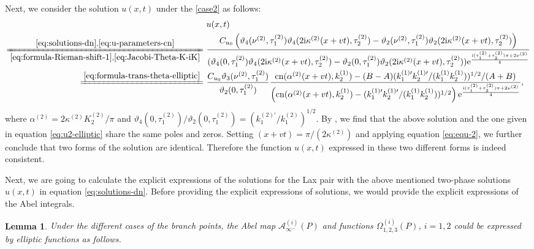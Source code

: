 \documentclass[11pt,reqno]{amsart}
\newcommand{\ii}{\mathrm{i}}
\newcommand{\cn}{\mathrm{cn}}
\newcommand{\ee}{\mathrm{e}}
\newtheorem{lemma}{Lemma}
\numberwithin{equation}{section}
\begin{document}
\begin{proof-prop-equivalent}
	Next, we consider the solution $u(x,t)$ under the \ref{case2} as follows:
	\begin{equation}\nonumber
		\begin{split}
			 &\ u(x,t)\\
			\xlongequal[\eqref{eq:formula-Rieman-shift-1}, \eqref{eq:Jacobi-Theta-K-iK}]{\eqref{eq:solutions-dn}, \eqref{eq:u-parameters-cn}}&\ \frac{C_{u_0}\left(\vartheta_4( \nu^{(2)} , \tau^{(2)} _1)\vartheta_4(2\ii  \kappa^{(2)} (x+vt), \tau^{(2)} _2)-\vartheta_2( \nu^{(2)} , \tau^{(2)} _1)\vartheta_2 (2\ii  \kappa^{(2)} (x+vt), \tau^{(2)} _2)\right)}{(\vartheta_4(0, \tau^{(2)} _1)\vartheta_4(2\ii  \kappa^{(2)} (x+vt), \tau^{(2)} _2)-\vartheta_2(0, \tau^{(2)} _1)\vartheta_2(2\ii  \kappa^{(2)} (x+vt), \tau^{(2)} _2))\ee^{\frac{\ii ( \tau^{(2)} _1+ \tau^{(2)} _2)\pi+2\nu^{(2)}}{4}}}\\
			\xlongequal{\eqref{eq:formula-trans-theta-elliptic}}&\ \frac{C_{u_0}\vartheta_3( \nu^{(2)} , \tau^{(2)} _1)}{\vartheta_2(0, \tau^{(2)} _1)}\frac{\cn( \alpha^{(2)} (x+vt),  k^{(1)}_2)-(B-A)(  k^{(1)\prime}_1  k^{(1)\prime}_2/(  k^{(1)}_1  k^{(1)}_2))^{1/2}/(A+B)}{\left(\cn(\alpha^{(2)} (x+vt),  k^{(1)}_2)-(  k^{(1)\prime}_1  k^{(1)\prime}_2/(  k^{(1)}_1  k^{(1)}_2))^{1/2}\right)\ee^{\frac{\ii ( \tau^{(2)} _1+ \tau^{(2)} _2)\pi+2\nu^{(2)}}{4}}},
		\end{split}
	\end{equation}
	where $ \alpha^{(2)} = 2\kappa^{(2)}   K^{(2)}_2/\pi$ and $\vartheta_4(0, \tau^{(2)} _1)/\vartheta_2(0, \tau^{(2)} _1)=(  k^{(2)\prime}_1/  k^{(2)}_1)^{1/2}$.
	By , we find that the above solution and the one given in equation \eqref{eq:u2-elliptic} share the same poles and zeros. Setting $(x+vt)=\pi/(2 \kappa^{(2)} )$ and applying equation \eqref{eq:equ-2}, we further conclude that two forms of the solution are identical. Therefore the function $u(x,t)$ expressed in these two different forms is indeed consistent.
\end{proof-prop-equivalent}


Next, we are going to calculate the explicit expressions of the solutions for the Lax pair with the above mentioned two-phase solutions $u(x,t)$ in equation \eqref{eq:solutions-dn}. 
Before providing the explicit expressions of solutions, we would provide the explicit expressions of the Abel integrals.

\begin{lemma}\label{lemma:Abel-integral}
	Under the different cases of the branch points, the Abel map $\mathcal{A}^{(i)}_{\infty^{-}}(P)$ and functions $\Omega_{1,2,3}^{(i)}(P)$, $i=1,2$ could be expressed by elliptic functions as follows.
\end{lemma}
\end{document}
